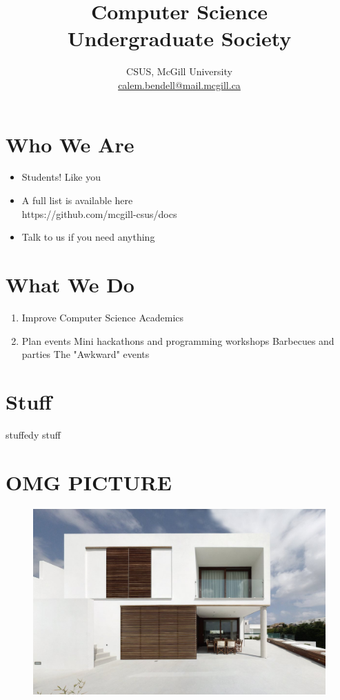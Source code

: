 

\title{Computer Science \\ Undergraduate Society \vspace*{2em}}
\author{
\large
CSUS, McGill University \\
\normalsize \href{mailto:calem.bendell@mail.mcgill.ca}{calem.bendell@mail.mcgill.ca}
}
\date{}



\maketitle

\clearpage

\section{Who We Are}

\begin{itemize}
	\item Students!  Like you
	\item A full list is available here \\ https://github.com/mcgill-csus/docs
	\item Talk to us if you need anything
\end{itemize}

\clearpage

\section{What We Do}

\begin{enumerate}
	\item Improve Computer Science Academics
	\item Plan events
		\subitem Mini hackathons and programming workshops
		\subitem Barbecues and parties
		\subitem The "Awkward" events
\end{enumerate}

\clearpage

\section{Stuff}

stuffedy stuff

\clearpage

\section{OMG PICTURE}

\begin{figure}[H]
	\centering
	\includegraphics[width=.7\textwidth]{gfx/modern-minimalist-square-house-menorca-sun-shades-for-the-windows-ideas.jpg}
\end{figure}

